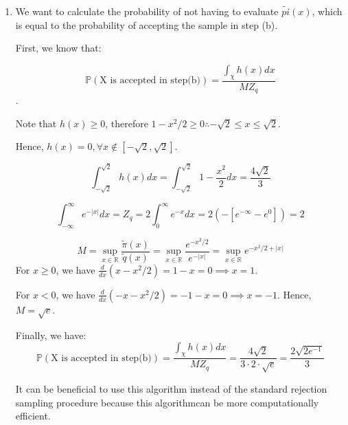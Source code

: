 \documentclass[12pt,letterpaper]{article}
\begin{document}
\begin{enumerate}[leftmargin=!,labelindent=5pt]
	 \item We want to calculate the probability of not having to
	 evaluate $\tilde{pi}(x)$, which is equal to the probability of
	 accepting the sample in step (b).

	 First, we know that:

	$$\mathbb{P}(\text{X is accepted in step(b)}) =
	 \frac{\int_{\chi}h(x)dx}{MZ_q}$$.

	 Note that $h(x) \geq 0$, therefore
	 $1 - x^2/2 \geq 0 \therefore -\sqrt{2} \leq x \leq \sqrt{2}$.

	 Hence, $ h(x) = 0, \forall x \notin [-\sqrt{2},\sqrt{2}]$.

	 $$\int_{-\sqrt2}^{\sqrt2}h(x)dx=
	 \int_{-\sqrt2}^{\sqrt2}1-\frac{x^2}{2}dx = \frac{4\sqrt2}{3}$$

	 $$\int_{-\infty}^{\infty}e^{-|x|}dx = Z_q =
	 2\int_{0}^{\infty}e^{-x}dx  = 2(-[e^{-\infty} - e^0]) = 2$$

	 $$ M = \sup_{x \in \mathbb{R}}\frac{\tilde{\pi}(x)}{\tilde{q}(x)}
	 = \sup_{x \in \mathbb{R}}\frac{e^{-x^2/2}}{e^{-|x|}}=
	 \sup_{x \in \mathbb{R}}e^{-x^2/2 + |x|}$$
	 For $x \geq 0$, we have $\frac{d}{dx}(x-x^2/2)= 1 - x = 0
	  \implies x = 1$.

	 For $x < 0$, we have $\frac{d}{dx}(-x-x^2/2)= -1 - x = 0
	 \implies x = -1$. Hence, $M = \sqrt e$.

	 Finally, we have:
	$$\mathbb{P}(\text{X is accepted in step(b)}) =
	 \frac{\int_{\chi}h(x)dx}{MZ_q} =
	 \frac{4\sqrt2}{3\cdot 2 \cdot \sqrt e} = \frac{2\sqrt{2e^{-1}}}{3}$$

	 It can be beneficial to use this algorithm instead of the standard
	 rejection sampling procedure because this algorithmcan be more
	 computationally efficient.






\end{enumerate}
\end{document}
